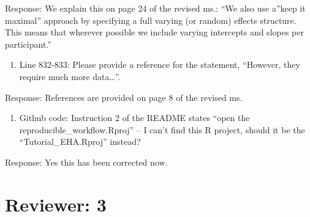 \documentclass[
]{article}
\providecommand{\tightlist}{%
  \setlength{\itemsep}{0pt}\setlength{\parskip}{0pt}}
\renewenvironment{quote}{\begin{leftbar}}{\end{leftbar}}
\begin{document}
Response: We explain this on page 24 of the revised ms.: ``We also use
a''keep it maximal'' approach by specifying a full varying (or random)
effects structure. This means that wherever possible we include varying
intercepts and slopes per participant.''

\begin{quote}
\begin{enumerate}
\def\labelenumi{\arabic{enumi}.}
\setcounter{enumi}{15}
\tightlist
\item
  Line 832-833: Please provide a reference for the statement, ``However,
  they require much more data\ldots{}''.
\end{enumerate}
\end{quote}

Response: References are provided on page 8 of the revised ms.

\begin{quote}
\begin{enumerate}
\def\labelenumi{\arabic{enumi}.}
\setcounter{enumi}{16}
\tightlist
\item
  Github code: Instruction 2 of the README states ``open the
  reproducible\_workflow.Rproj'' -- I can't find this R project, should
  it be the ``Tutorial\_EHA.Rproj'' instead?
\end{enumerate}
\end{quote}

Response: Yes this has been corrected now.

\section{Reviewer: 3}\label{reviewer-3}
\end{document}

